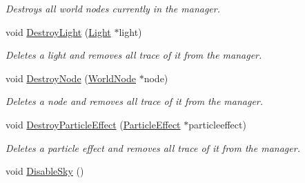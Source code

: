 \begin{DoxyCompactItemize}
\begin{DoxyCompactList}\small\item\em Destroys all world nodes currently in the manager. \item\end{DoxyCompactList}\item 
void \hyperlink{classphys_1_1SceneManager_a0f6ebec4e8a372b0fcc2b2205bac7725}{DestroyLight} (\hyperlink{classphys_1_1Light}{Light} $\ast$light)
\begin{DoxyCompactList}\small\item\em Deletes a light and removes all trace of it from the manager. \item\end{DoxyCompactList}\item 
void \hyperlink{classphys_1_1SceneManager_a5a2d68ab38308f9c6ac4b659cae36dee}{DestroyNode} (\hyperlink{classphys_1_1WorldNode}{WorldNode} $\ast$node)
\begin{DoxyCompactList}\small\item\em Deletes a node and removes all trace of it from the manager. \item\end{DoxyCompactList}\item 
void \hyperlink{classphys_1_1SceneManager_addce8f82a6758db345568dbd4a88f5b9}{DestroyParticleEffect} (\hyperlink{classphys_1_1ParticleEffect}{ParticleEffect} $\ast$particleeffect)
\begin{DoxyCompactList}\small\item\em Deletes a particle effect and removes all trace of it from the manager. \item\end{DoxyCompactList}\item 
\hypertarget{classphys_1_1SceneManager_a929da26f1fcdbe98484b7162dcf2d16f}{
void \hyperlink{classphys_1_1SceneManager_a929da26f1fcdbe98484b7162dcf2d16f}{DisableSky} ()}
\label{classphys_1_1SceneManager_a929da26f1fcdbe98484b7162dcf2d16f}


\end{DoxyCompactItemize}
